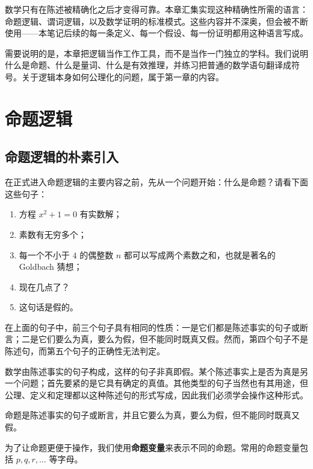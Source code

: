 
\chapterzero

数学只有在陈述被精确化之后才变得可靠。本章汇集实现这种精确性所需的语言：命题逻辑、谓词逻辑，以及数学证明的标准模式。这些内容并不深奥，但会被不断使用——本笔记后续的每一条定义、每一个假设、每一份证明都用这种语言写成。

需要说明的是，本章把逻辑当作工作工具，而不是当作一门独立的学科。我们说明什么是命题、什么是量词、什么是有效推理，并练习把普通的数学语句翻译成符号。关于逻辑本身如何公理化的问题，属于第一章的内容。

\section{命题逻辑}

\subsection{命题逻辑的朴素引入}

在正式进入命题逻辑的主要内容之前，先从一个问题开始：什么是命题？请看下面这些句子：

\begin{enumerate}
    \item 方程 $x^2+1=0$ 有实数解；
    \item 素数有无穷多个；
    \item 每一个不小于 $4$ 的偶整数 $n$ 都可以写成两个素数之和，也就是著名的 Goldbach 猜想；
    \item 现在几点了？
    \item 这句话是假的。
\end{enumerate}

在上面的句子中，前三个句子具有相同的性质：一是它们都是陈述事实的句子或断言；二是它们要么为真，要么为假，但不能同时既真又假。然而，第四个句子不是陈述句，而第五个句子的正确性无法判定。

数学由陈述事实的句子构成，这样的句子非真即假。某个陈述事实上是否为真是另一个问题；首先要紧的是它具有确定的真值。其他类型的句子当然也有其用途，但公理、定义和定理都以这种陈述句的形式写成，因此我们必须学会操作这种形式。

\begin{definition}[命题]
命题是陈述事实的句子或断言，并且它要么为真，要么为假，但不能同时既真又假。
\end{definition}

为了让命题更便于操作，我们使用\textbf{命题变量}来表示不同的命题。常用的命题变量包括 $p,q,r,\dots$ 等字母。

